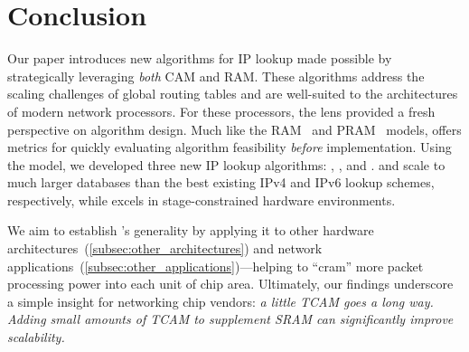 \section{Conclusion}
\label{sec:conclusion}

Our paper introduces new algorithms for IP lookup made possible by strategically leveraging {\em both} CAM and RAM. These algorithms address the scaling challenges of global routing tables and are well-suited to the architectures of modern network processors. For these processors, the \cram lens provided a fresh perspective on algorithm design. Much like the RAM~\cite{ram} and PRAM~\cite{pram} models, \cram offers metrics for quickly evaluating algorithm feasibility {\em before} implementation. Using the \cram model, we developed three new IP lookup algorithms: \resail, \bsic, and \mashup. \resail and \bsic scale to much larger databases than the best existing IPv4 and IPv6 lookup schemes, respectively, while \mashup excels in stage-constrained hardware environments.

We aim to establish \cram's generality by applying it to other hardware architectures~(\cref{subsec:other_architectures}) and network applications~(\cref{subsec:other_applications})---helping to ``cram'' more packet processing power into each unit of chip area. Ultimately, our findings underscore a simple insight for networking chip vendors: \textit{a little TCAM goes a long way. Adding small amounts of TCAM to supplement SRAM can significantly improve scalability.}